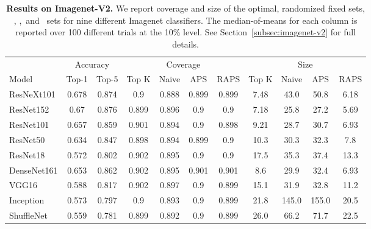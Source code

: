 \begin{table}[t] 
\centering 
\small 
\begin{tabular}{lcccccccccc} 
\toprule 
 & \multicolumn{2}{c}{Accuracy}  & \multicolumn{4}{c}{Coverage} & \multicolumn{4}{c}{Size} \\ 
\cmidrule(r){2-3}  \cmidrule(r){4-7}  \cmidrule(r){8-11} 
Model & Top-1 & Top-5 & Top K & Naive & APS & RAPS & Top K & Naive & APS & RAPS \\ 
\midrule 
 ResNeXt101 &  0.678 &  0.874 & 0.9 & 0.888 & 0.899 & 0.899 & 7.48 & 43.0 & 50.8 & 6.18 \\ 
 ResNet152 &  0.67 &  0.876 & 0.899 & 0.896 & 0.9 & 0.9 & 7.18 & 25.8 & 27.2 & 5.69 \\ 
 ResNet101 &  0.657 &  0.859 & 0.901 & 0.894 & 0.9 & 0.898 & 9.21 & 28.7 & 30.7 & 6.93 \\ 
 ResNet50 &  0.634 &  0.847 & 0.898 & 0.894 & 0.899 & 0.9 & 10.3 & 30.3 & 32.3 & 7.8 \\ 
 ResNet18 &  0.572 &  0.802 & 0.902 & 0.895 & 0.9 & 0.9 & 17.5 & 35.3 & 37.4 & 13.3 \\ 
 DenseNet161 &  0.653 &  0.862 & 0.902 & 0.895 & 0.901 & 0.901 & 8.6 & 29.9 & 32.4 & 6.93 \\ 
 VGG16 &  0.588 &  0.817 & 0.902 & 0.897 & 0.9 & 0.899 & 15.1 & 31.9 & 32.8 & 11.2 \\ 
 Inception &  0.573 &  0.797 & 0.9 & 0.893 & 0.9 & 0.899 & 21.8 & 145.0 & 155.0 & 20.5 \\ 
 ShuffleNet &  0.559 &  0.781 & 0.899 & 0.892 & 0.9 & 0.899 & 26.0 & 66.2 & 71.7 & 22.5 \\ 
\bottomrule 
\end{tabular} 
\caption{\textbf{Results on Imagenet-V2.} We report coverage and size of the optimal, randomized fixed sets, \naive, \aps,\ and \raps\ sets for nine different Imagenet classifiers. The median-of-means for each column is reported over 100 different trials at the 10\% level. See Section~\ref{subsec:imagenet-v2} for full details.} 
\label{table:imagenet-v2} 
\end{table} 
